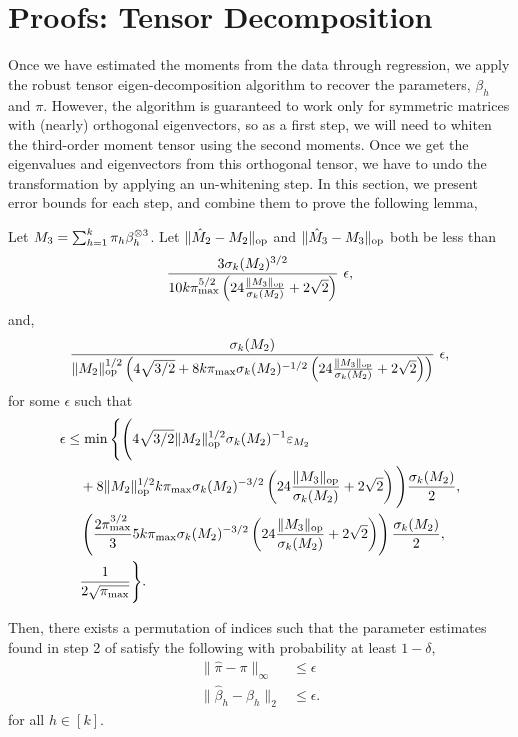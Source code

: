 
\section{Proofs: Tensor Decomposition}
\label{sec:proofs:tensors}

Once we have estimated the moments from the data through regression, we apply the robust tensor eigen-decomposition algorithm to recover the parameters, $\beta_h$ and $\pi$. However, the algorithm is guaranteed to work only for symmetric matrices with (nearly) orthogonal eigenvectors, so as a first step, we will need to whiten the third-order moment tensor using the second moments. Once we get the eigenvalues and eigenvectors from this orthogonal tensor, we have to undo the transformation by applying an un-whitening step. In this section, we present error bounds for each step, and combine them to prove the following lemma,
\begin{lemma}
  \label{lem:tensorPower} 
  Let $M_3 = \sum_{h=1}^{k} \pi_h \beta_h^{\otimes 3}$.
  Let $\|\hat M_2 - M_2\|_{\text{\rm op}}$ and
  $\|\hat M_3 - M_3\|_{\text{\rm op}}$ both be less than
  \begin{align*}
    \frac{3\sigma_k(M_2)^{3/2}}{10 k \pi_{\max}^{5/2}
    \left(24 \frac{\| {M_3} \|_{\text{\rm op}}}{\sigma_k(M_2)} + 2\sqrt{2} \right)}~ \epsilon,
  \end{align*}
  and,
\begin{align*}
  \frac{\sigma_k(M_2)}
    {\|M_2\|_{\text{\rm op}}^{1/2} \left(
    4\sqrt{3/2} + 8 k \pi_{\max} 
    \sigma_k(M_2)^{-1/2}
    \left(24 \frac{\| {M_3} \|_{\text{\rm op}}}{\sigma_k(M_2)} + 2\sqrt{2} \right) \right) }~ \epsilon,
\end{align*}
for some $\epsilon$ such that 
\begin{align*}
  \epsilon &\le 
    \min\Bigg\{
      \Bigg( 4\sqrt{3/2} \|M_2\|_{\text{\rm op}}^{1/2} \sigma_k(M_2)^{-1} \varepsilon_{M_2} \\
     &\quad + 8 \|M_2\|_{\text{\rm op}}^{1/2} k \pi_{\max} \sigma_k(M_2)^{-3/2}
        \left(24 \frac{\| {M_3} \|_{\text{\rm op}}}{\sigma_k(M_2)} + 2\sqrt{2} \right) \Bigg) \frac{\sigma_k(M_2)}{2}, \\
  &\quad \left( \frac{2 \pi_{\max}^{3/2}}{3} 5 k \pi_{\max} 
    \sigma_k(M_2)^{-3/2}
    \left(24 \frac{\| {M_3} \|_{\text{\rm op}}}{\sigma_k(M_2)} + 2\sqrt{2} \right)  \right) \frac{\sigma_k(M_2)}{2}, \\
      &\quad \frac{1}{2\sqrt{\pi_{\max}}} \Bigg\}.
\end{align*}

  Then, there exists a permutation of indices such that  the parameter
  estimates found in step 2 of 
  \iftoggle{withappendix}{%
  \algorithmref{algo:spectral-experts}
  }{%
  \citet[Algorithm 1]{ChagantyLiang2013}
  }
  satisfy the following with probability at least $1 - \delta$,
  \begin{align*}
  \|\hat \pi - \pi \|_{\infty} &\le \epsilon \\
  \|\hat \beta_h - \beta_h\|_2 &\le \epsilon.
  \end{align*}
  for all $h \in [k]$.
\end{lemma}

